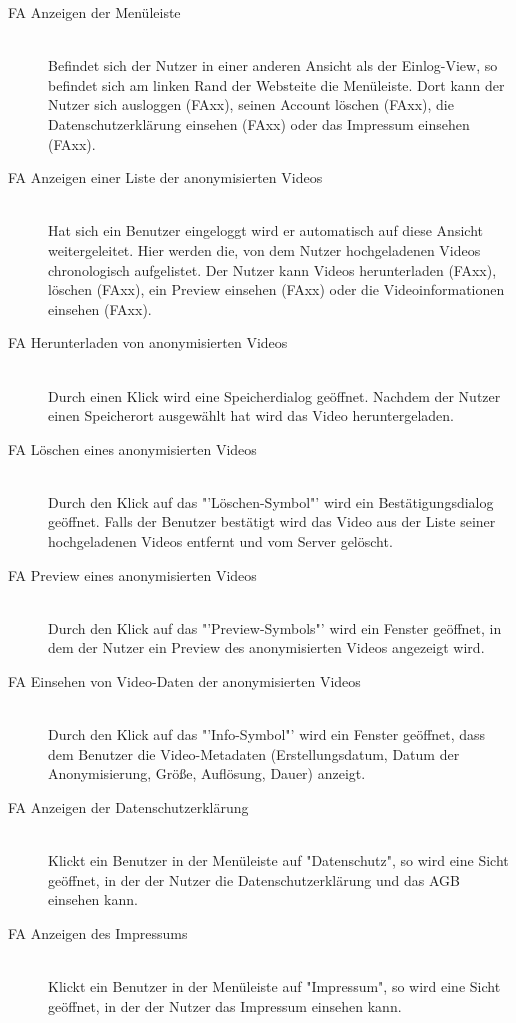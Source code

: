 \begin{description}
\item[FA Anzeigen der Menüleiste] \hfill \\
Befindet sich der Nutzer in einer anderen Ansicht als der Einlog-View, so befindet sich am linken Rand der Websteite die Menüleiste. Dort kann der Nutzer sich ausloggen (FAxx), seinen Account löschen (FAxx), die Datenschutzerklärung einsehen (FAxx) oder das Impressum einsehen (FAxx).

\item[FA Anzeigen einer Liste der anonymisierten Videos] \hfill \\
Hat sich ein Benutzer eingeloggt wird er automatisch auf diese Ansicht weitergeleitet. Hier werden die, von dem Nutzer hochgeladenen Videos chronologisch aufgelistet. Der Nutzer kann Videos herunterladen (FAxx), löschen (FAxx), ein Preview einsehen (FAxx) oder die Videoinformationen einsehen (FAxx).

\item[FA Herunterladen von anonymisierten Videos] \hfill \\
Durch einen Klick wird eine Speicherdialog geöffnet. Nachdem der Nutzer einen Speicherort ausgewählt hat wird das Video heruntergeladen.

\item[FA Löschen eines anonymisierten Videos] \hfill \\
Durch den Klick auf das "'Löschen-Symbol"' wird ein Bestätigungsdialog geöffnet. Falls der Benutzer bestätigt wird das Video aus der Liste seiner hochgeladenen Videos entfernt und vom Server gelöscht.

\item[FA Preview eines anonymisierten Videos] \hfill \\
Durch den Klick auf das "'Preview-Symbols"' wird ein Fenster geöffnet, in dem der Nutzer ein Preview des anonymisierten Videos angezeigt wird.

\item[FA Einsehen von Video-Daten der anonymisierten Videos] \hfill \\
Durch den Klick auf das "'Info-Symbol"' wird ein Fenster geöffnet, dass dem Benutzer die Video-Metadaten (Erstellungsdatum, Datum der Anonymisierung, Größe, Auflösung, Dauer) anzeigt.

\item[FA Anzeigen der Datenschutzerklärung] \hfill \\
Klickt ein Benutzer in der Menüleiste auf "Datenschutz", so wird eine Sicht geöffnet, in der der Nutzer die Datenschutzerklärung und das AGB einsehen kann.

\item[FA Anzeigen des Impressums] \hfill \\
Klickt ein Benutzer in der Menüleiste auf "Impressum", so wird eine Sicht geöffnet, in der der Nutzer das Impressum einsehen kann.

\end{description}


